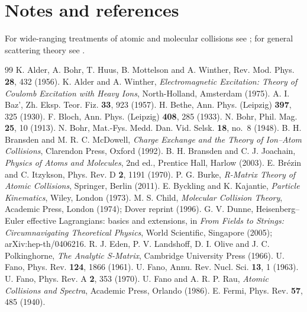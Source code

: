\documentclass[11pt,a4paper]{book}
\numberwithin{equation}{chapter}
\begin{document}
\section*{Notes and references}
For wide-ranging treatments of atomic and molecular collisions see \cite{MM,BJ,FanoRau,BM,Child,NU,Burke}; for general scattering theory see \cite{Newton,Taylor,GW}.

\backmatter
\renewcommand{\bibname}{References}
\begin{thebibliography}{99}
 K. Alder, A. Bohr, T. Huus, B. Mottelson and A. Winther, Rev. Mod. Phys. \textbf{28}, 432 (1956).
 K. Alder and A. Winther, \emph{Electromagnetic Excitation: Theory of Coulomb Excitation with Heavy Ions}, North-Holland, Amsterdam (1975).
 A. I. Baz', Zh. Eksp. Teor. Fiz. \textbf{33}, 923 (1957).
 H. Bethe, Ann. Phys. (Leipzig) \textbf{397}, 325 (1930).
 F. Bloch, Ann. Phys. (Leipzig) \textbf{408}, 285 (1933).
 N. Bohr, Phil. Mag. \textbf{25}, 10 (1913).
 N. Bohr, Mat.-Fys. Medd. Dan. Vid. Selsk. \textbf{18}, no.~8 (1948).
 B. H. Bransden and M. R. C. McDowell, \emph{Charge Exchange and the Theory of Ion--Atom Collisions}, Clarendon Press, Oxford (1992).
 B. H. Bransden and C. J. Joachain, \emph{Physics of Atoms and Molecules}, 2nd ed., Prentice Hall, Harlow (2003).
 E. Br\'ezin and C. Itzykson, Phys. Rev. D \textbf{2}, 1191 (1970).
 P. G. Burke, \emph{R-Matrix Theory of Atomic Collisions}, Springer, Berlin (2011).
 E. Byckling and K. Kajantie, \emph{Particle Kinematics}, Wiley, London (1973).
 M. S. Child, \emph{Molecular Collision Theory}, Academic Press, London (1974); Dover reprint (1996).
 G. V. Dunne, Heisenberg--Euler effective Lagrangians: basics and extensions, in \emph{From Fields to Strings: Circumnavigating Theoretical Physics}, World Scientific, Singapore (2005); arXiv:hep-th/0406216.
 R. J. Eden, P. V. Landshoff, D. I. Olive and J. C. Polkinghorne, \emph{The Analytic S-Matrix}, Cambridge University Press (1966).
 U. Fano, Phys. Rev. \textbf{124}, 1866 (1961).
 U. Fano, Annu. Rev. Nucl. Sci. \textbf{13}, 1 (1963).
 U. Fano, Phys. Rev. A \textbf{2}, 353 (1970).
 U. Fano and A. R. P. Rau, \emph{Atomic Collisions and Spectra}, Academic Press, Orlando (1986).
 E. Fermi, Phys. Rev. \textbf{57}, 485 (1940).

\end{thebibliography}
\end{document}
